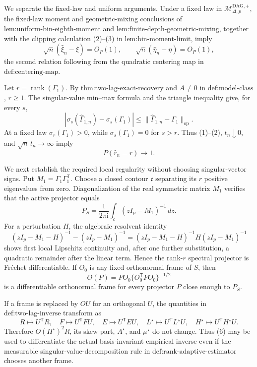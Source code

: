 We separate the fixed-law and uniform arguments.  Under a fixed law in \(\mathcal M_{\Delta,p}^{\mathrm{DAG},+}\), the fixed-law moment and geometric-mixing conclusions of \(\text{lem:uniform-bin-eighth-moment}\) and \(\text{lem:finite-depth-geometric-mixing}\), together with the clipping calculation (2)--(3) in \(\text{lem:bin-moment-limit}\), imply
\[
 \sqrt n(\widehat\xi_n-\xi)=O_P(1),
 \qquad
 \sqrt n(\widehat\eta_n-\eta)=O_P(1),
\tag{1}
\]
the second relation following from the quadratic centering map in \(\text{def:centering-map}\).

Let \(r=\operatorname{rank}(\Gamma_1)\).  By \(\text{thm:two-lag-exact-recovery}\) and \(A\neq0\) in \(\text{def:model-class}\), \(r\geq1\).  The singular-value min--max formula and the triangle inequality give, for every \(s\),
\[
 |\sigma_s(\widehat\Gamma_{1,n})-\sigma_s(\Gamma_1)|
 \leq\lVert\widehat\Gamma_{1,n}-\Gamma_1\rVert_{\mathrm{op}}.
\tag{2}
\]
At a fixed law \(\sigma_r(\Gamma_1)>0\), while \(\sigma_s(\Gamma_1)=0\) for \(s>r\).  Thus (1)--(2), \(t_n\downarrow0\), and \(\sqrt n\,t_n\to\infty\) imply
\[
 P(\widehat r_n=r)\longrightarrow1.
\tag{3}
\]

We next establish the required local regularity without choosing singular-vector signs.  Put \(M_1=\Gamma_1\Gamma_1^{\mathsf T}\).  Choose a closed contour \(\mathfrak c\) separating its \(r\) positive eigenvalues from zero.  Diagonalization of the real symmetric matrix \(M_1\) verifies that the active projector equals
\[
 P_S=\frac{1}{2\pi\mathrm i}\int_{\mathfrak c}(zI_p-M_1)^{-1}\,dz.
\tag{4}
\]
For a perturbation \(H\), the algebraic resolvent identity
\[
 (zI_p-M_1-H)^{-1}-(zI_p-M_1)^{-1}
 =(zI_p-M_1-H)^{-1}H(zI_p-M_1)^{-1}
\tag{5}
\]
shows first local Lipschitz continuity and, after one further substitution, a quadratic remainder after the linear term.  Hence the rank-\(r\) spectral projector is Fr\'{e}chet differentiable.  If \(O_0\) is any fixed orthonormal frame of \(S\), then
\[
 O(P)=PO_0\{O_0^{\mathsf T}PO_0\}^{-1/2}
\tag{6}
\]
is a differentiable orthonormal frame for every projector \(P\) close enough to \(P_S\).

If a frame is replaced by \(OU\) for an orthogonal \(U\), the quantities in \(\text{def:two-lag-inverse}\) transform as
\[
 R\mapsto U^{\mathsf T}R,\quad F\mapsto U^{\mathsf T}FU,\quad
 E\mapsto U^{\mathsf T}EU,\quad L^\star\mapsto U^{\mathsf T}L^\star U,\quad
 H^\star\mapsto U^{\mathsf T}H^\star U.
\tag{7}
\]
Therefore \(O(H^\star)^2R\), its skew part, \(A^\star\), and \(\mu^\star\) do not change.  Thus (6) may be used to differentiate the actual basis-invariant empirical inverse even if the measurable singular-value-decomposition rule in \(\text{def:rank-adaptive-estimator}\) chooses another frame.

